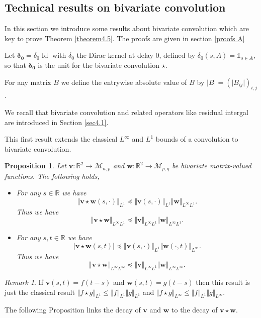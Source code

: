 \documentclass[reqno,final,11pt]{amsart}
\theoremstyle{plain}
\newtheorem{proposition}[theorem]{Proposition}
\theoremstyle{definition}
\theoremstyle{remark}
\newtheorem{remark}[theorem]{Remark}
\newcommand{\R}{\mathds{R}}
\newcommand{\ind}{\mathds{1}}
\newcommand{\Vone}[1]{\Vert #1 \Vert_{L^1}}
\newcommand{\Vity}[1]{\Vert #1 \Vert_{L^{\infty}}}
\newcommand{\Vityty}[1]{\Vert #1 \Vert_{L^{\infty}L^{\infty}}}
\newcommand{\Vityone}[1]{\Vert #1 \Vert_{L^{\infty}L^{1}}}
\DeclareMathOperator{\Id}{Id}
\begin{document}
\subsection{Technical results on bivariate convolution}\label{appendixA.2}

In this section we introduce some results about bivariate convolution which are key to prove Theorem \ref{theorem4.5}. The proofs are given in section \ref{proofs A}

Let $\bm{\delta_0} = \delta_0 \Id$ with $\delta_0$ the Dirac kernel at delay $0$, defined by $\delta_0(s,A)= \ind_{s\in A}$, so that $\bm{\delta_0}$ is the unit for the bivariate convolution $\star$.

For any matrix $B$ we define the entrywise absolute value of $B$ by $\vert B\vert = (\vert B_{ij}\vert)_{i,j}$.

We recall that bivariate convolution and related operators like residual intergal are introduced in Section \ref{sec4.1}.

This first result extends the classical $L^{\infty}$ and $L^1$ bounds of a convolution to bivariate convolution.

\begin{proposition}\label{prop4.1}
	Let $\bm{v}:\R^2 \to \mathcal{M}_{n,p}$ and $\bm{w} : \R^2 \to \mathcal{M}_{p,q}$ be bivariate matrix-valued functions. The following holds,
	\begin{itemize}
		\item For any $s\in\R$ we have \[\Vone{\bm{v}\star\bm{w}(s,\cdot)} \preceq \Vone{\bm{v}(s,\cdot)}  \Vityone{\bm{w}}.\] Thus we have \[ \Vityone{\bm{v}\star\bm{w}} \preceq \Vityone{\bm{v}}  \Vityone{\bm{w}}.\]
		\item For any $s,t\in\R$ we have \[\vert\bm{v}\star\bm{w}(s,t)\vert \preceq \Vone{\bm{v}(s,\cdot)}  \Vity{ \bm{w}(\cdot,t)}.\] Thus we have \[ \Vityty{\bm{v}\star\bm{w}} \preceq \Vityone{\bm{v}} \Vityty{\bm{w}}.\]
	\end{itemize}
\end{proposition}

\begin{remark}
	If $\bm{v}(s,t) = f(t-s)$ and $\bm{w}(s,t)=g(t-s)$ then this result is just the classical result $\Vone{f\star g} \leq \Vone{f} \Vone{g}$ and $\Vity{f\star g} \leq \Vone{f} \Vity{g}$.
\end{remark}

The following Proposition links the decay of $\bm{v}$ and $\bm{w}$ to the decay of $\bm{v}\star\bm{w}$.
\end{document}
